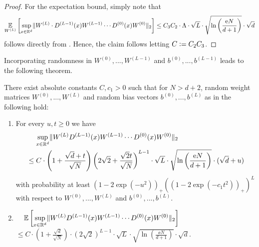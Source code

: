 \begin{proof}
For the expectation bound, simply note that 
\begin{align*}
\underset{W^{(L)}}{\mathbb{E}} \left[ \underset{x \in \mathbb{R}^d}{\sup} \Vert W^{(L)} \cdot D^{(L-1)}(x)W^{(L-1)} \cdots D^{(0)}(x)W^{(0)}\Vert_2\right] \leq C_3C_2 \cdot \Lambda \cdot \sqrt{L} \cdot \sqrt{\ln \left(\frac{\mathrm{e} N}{d+1}\right)} \cdot \sqrt{d}
\end{align*}
follows directly from . Hence, the claim follows letting $C \mathrel{\mathop:}= C_2C_3$.
\end{proof}

Incorporating randomness in $W^{(0)}, ..., W^{(L-1)}$ and $b^{(0)}, ..., b^{(L-1)}$ leads to the following theorem.
\begin{theorem} \label{thm:deep_finall}
There exist absolute constants $C, c_1 > 0$ such that for $N > d+2$, random weight matrices $W^{(0)},...,W^{(L)}$ and random bias vectors $b^{(0)},...,b^{(L)}$ as in  the following hold:
\begin{enumerate}
\item{
For every $u,t \geq 0$ we have 
\begin{align*}
&\norel \underset{x \in \RR^d}{\sup} \Vert W^{(L)}D^{(L-1)}(x)W^{(L-1)}\cdots D^{(0)}(x) W^{(0)} \Vert_2 \\
&\leq C \cdot \left(1 + \frac{\sqrt{d} + t}{\sqrt{N}}\right)\left(2\sqrt{2} + \frac{\sqrt{2} t}{\sqrt{N}}\right)^{L-1} \cdot \sqrt{L} \cdot \sqrt{\ln \left(\frac{\ee N}{d+1}\right)} \cdot (\sqrt{d} + u)
\end{align*}
with probability at least $(1-2\exp(-u^2))_+\left((1-2\exp(-c_1 t^2))_+\right)^L$ with respect to $W^{(0)},..., W^{(L)}$ and $b^{(0)},...,b^{(L)}$.
}
\item{
$\displaystyle
 \norel\EE\left[\underset{x \in \RR^d}{\sup} \Vert W^{(L)}D^{(L-1)}(x)W^{(L-1)}\cdots D^{(0)}(x) W^{(0)} \Vert_2 \right] $ \\
$\displaystyle \leq C \cdot \left( 1 + \frac{\sqrt{d}}{\sqrt{N}}\right) \cdot (2 \sqrt{2})^{L-1} \cdot \sqrt{L} \cdot \sqrt{\ln \left(\frac{\ee N}{d+1}\right)} \cdot \sqrt{d}.$
}
\end{enumerate}
\end{theorem}
